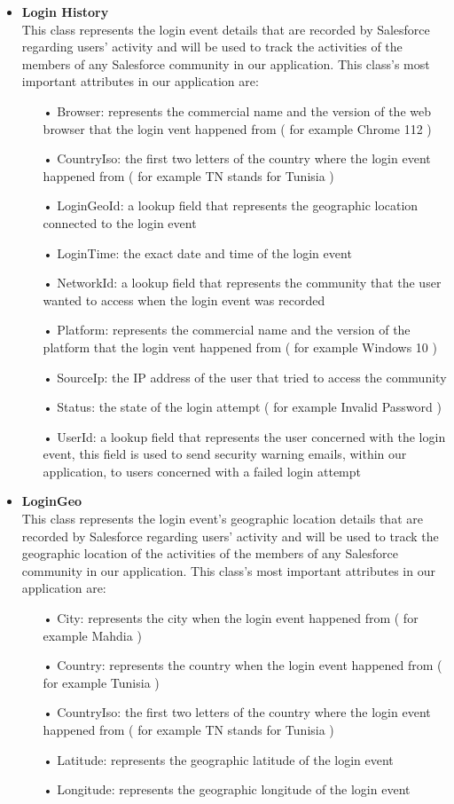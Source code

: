 \begin{itemize}
\begin{itemize}
\end{itemize}

\item \textbf{Login History}\\
This class represents the login event details that are recorded by Salesforce regarding users' activity and will be used to track the activities of the members of any Salesforce community in our application. This class's most important attributes in our application are:
\begin{itemize}
\item[•] Browser: represents the commercial name and the version of the web browser that the login vent happened from ( for example Chrome 112 ) 
\item[•] CountryIso: the first two letters of the country where the login event happened from ( for example TN stands for Tunisia )
\item[•] LoginGeoId: a lookup field that represents the geographic location connected to the login event
\item[•] LoginTime: the exact date and time of the login event
\item[•] NetworkId:  a lookup field that represents the community that the user wanted to access when the login event was recorded
\item[•] Platform: represents the commercial name and the version of the platform that the login vent happened from ( for example Windows 10 )
\item[•] SourceIp: the IP address of the user that tried to access the community 
\item[•] Status: the state of the login attempt ( for example Invalid Password )
\item[•] UserId: a lookup field that represents the user concerned with the login event, this field is used to send security warning emails, within our application, to users concerned with a failed login attempt 

\end{itemize}
\item \textbf{LoginGeo}\\
This class represents the login event's geographic location details that are recorded by Salesforce regarding users' activity and will be used to track the geographic location of the activities of the members of any Salesforce community in our application. This class's most important attributes in our application are:
\begin{itemize}
\item[•] City: represents the city when the login event happened from ( for example Mahdia )
\item[•] Country: represents the country when the login event happened from ( for example Tunisia )
\item[•] CountryIso: the first two letters of the country where the login event happened from ( for example TN stands for Tunisia )
\item[•] Latitude: represents the geographic latitude of the login event
\item[•] Longitude: represents the geographic longitude of the login event


\end{itemize}
\end{itemize}
